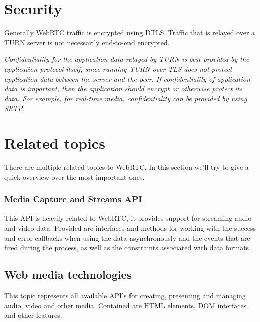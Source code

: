 \section{Security}
Generally WebRTC traffic is encrypted using DTLS. Traffic that is relayed over a TURN server is not necessarily end-to-end encrypted.

\textit{Confidentiality for the application data relayed by TURN is best provided by the application protocol itself, since running TURN over TLS does not protect application data between the server and the peer. If confidentiality of application data is important, then the application should encrypt or otherwise protect its data. For example, for real-time media, confidentiality can be provided by using SRTP.}~\cite{TURN:sec}

\section{Related topics}
There are multiple related topics to WebRTC. In this section we'll try to give a quick overview over the most important ones.

\subsubsection{Media Capture and Streams API}
This API is heavily related to WebRTC, it provides support for streaming audio and video data. Provided are interfaces and methods for working with the success and error callbacks when using the data asynchronously and the events that are fired during the process, as well as the constraints associated with data formats.

\subsection{Web media technologies}
This topic represents all available API's for creating, presenting and managing audio, video and other media. Contained are HTML elements, DOM interfaces and other features.